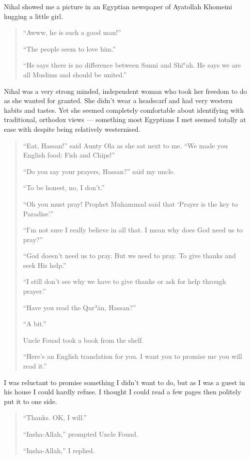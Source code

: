 \documentclass[12pt]{memoir}
\def\´{ʾ} %
\def\`{ʿ} %
\def \Quran{Qur\-\´ān} %
\begin{document}
Nihal showed me a picture in an Egyptian newspaper
of Ayatollah Khomeini hugging a little girl.

\begin{quote}
“Awww, he is such a good man!”

“The people seem to love him.”

“He says there is no difference between Sunni and Shi\`ah.
He says we are all Muslims and should be united.”
\end{quote}

Nihal was a very strong minded,
independent woman who took her freedom to do as she wanted for granted.
She didn’t wear a headscarf and had very western habits and tastes.
Yet she seemed completely comfortable about identifying with traditional,
orthodox views — something most Egyptians I met
seemed totally at ease with despite being relatively westernised.

\begin{quote}
“Eat, Hassan!” said Aunty Ola as she sat next to me.
“We made you English food: Fish and Chips!”

“Do you say your prayers, Hassan?” said my uncle.

“To be honest, no, I don’t.”

“Oh you must pray!
Prophet Muhammad said that ‘Prayer is the key to Paradise’.”

“I’m not sure I really believe in all that.
I mean why does God need us to pray?”

“God doesn’t need us to pray.
But we need to pray.
To give thanks and seek His help.”

“I still don’t see why we have to give thanks or ask for help through prayer.”

“Have you read the \Quran, Hassan?”

“A bit.”

Uncle Fouad took a book from the shelf.

“Here’s an English translation for you.
I want you to promise me you will read it.”
\end{quote}

I was reluctant to promise something I didn’t want to do,
but as I was a guest in his house I could hardly refuse.
I thought I could read a few pages then politely put it to one side.

\begin{quote}
“Thanks. OK, I will.”

“Insha-Allah,” prompted Uncle Fouad.

“Insha-Allah,” I replied.
\end{quote}
\end{document}
